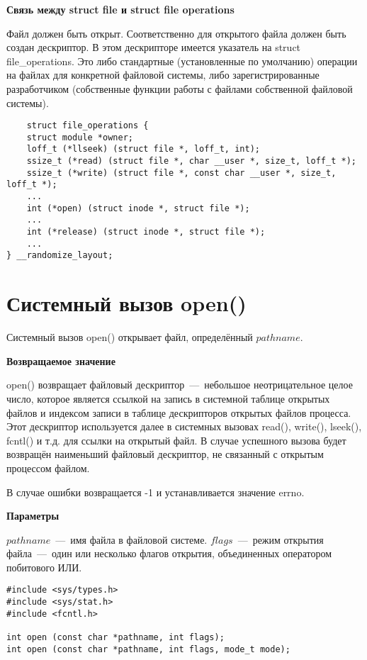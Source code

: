 \textbf{Связь между struct file и struct file operations}

Файл должен быть открыт. Соответственно для открытого файла должен быть создан дескриптор. В этом дескрипторе имеется указатель на struct file\_operations. Это либо стандартные (установленные по умолчанию) операции на файлах для конкретной файловой системы, либо зарегистрированные разработчиком (собственные функции работы с файлами собственной файловой системы).

\begin{lstlisting}
	struct file_operations {
	struct module *owner;
	loff_t (*llseek) (struct file *, loff_t, int);
	ssize_t (*read) (struct file *, char __user *, size_t, loff_t *);
	ssize_t (*write) (struct file *, const char __user *, size_t, loff_t *);
	...
	int (*open) (struct inode *, struct file *);
	...
	int (*release) (struct inode *, struct file *);
	...
} __randomize_layout;
\end{lstlisting}

\section{Системный вызов open()}
Системный вызов open() открывает файл, определённый $pathname$.

\textbf{Возвращаемое значение}

open() возвращает файловый дескриптор~---~небольшое неотрицательное целое число, которое является ссылкой на запись в системной таблице открытых файлов и индексом записи в таблице дескрипторов открытых файлов процесса. Этот дескриптор используется далее в системных вызовах read(), write(), lseek(), fcntl() и т.д. для ссылки на открытый файл. В случае успешного вызова будет возвращён наименьший файловый дескриптор, не связанный с открытым процессом файлом.

В случае ошибки возвращается -1 и устанавливается значение errno.

\textbf{Параметры}

$pathname$~---~имя файла в файловой системе. $flags$~---~режим открытия файла~---~один или несколько флагов открытия, объединенных оператором побитового ИЛИ. 

\begin{lstlisting}
#include <sys/types.h>
#include <sys/stat.h>
#include <fcntl.h>

int open (const char *pathname, int flags);
int open (const char *pathname, int flags, mode_t mode);
\end{lstlisting}

